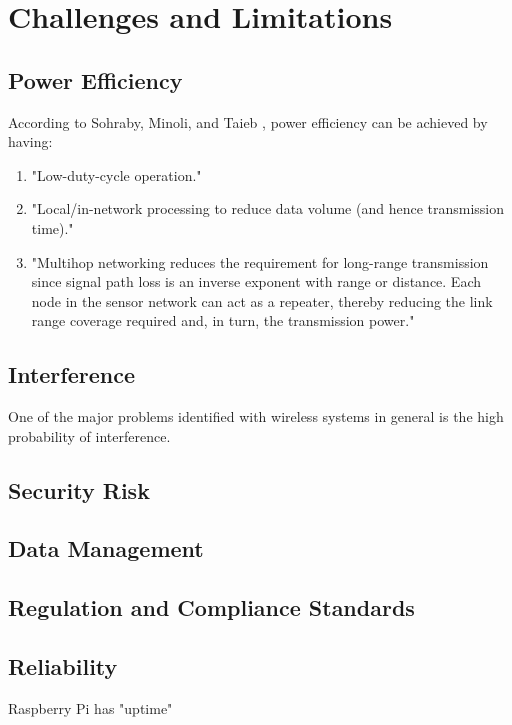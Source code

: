 \chapter{Challenges and Limitations}

\section{Power Efficiency}

According to Sohraby, Minoli, and Taieb \cite{sohraby2007wireless}, power efficiency can be achieved by having: 

\begin{enumerate}
	\item "Low-duty-cycle operation."
	\item "Local/in-network processing to reduce data volume (and hence transmission time)."
	\item "Multihop networking reduces the requirement for long-range transmission since signal path loss is an inverse exponent with range or distance. Each node in the sensor network can act as a repeater, thereby reducing the link range coverage required and, in turn, the transmission power." 
\end{enumerate}

\section{Interference}

One of the major problems identified with wireless systems in general is the high probability of interference. 

\section{Security Risk}

\section{Data Management}

\section{Regulation and Compliance Standards}

\section{Reliability}
Raspberry Pi has "uptime"

